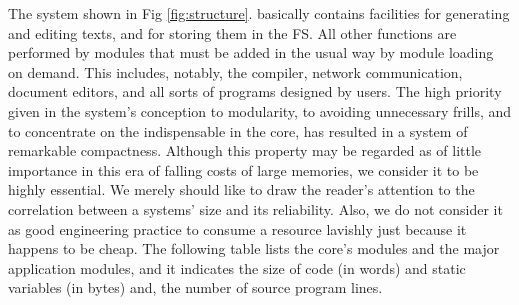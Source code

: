 The system shown in Fig \ref{fig:structure}. basically contains facilities for generating and editing texts, and for
storing them in the FS. All other functions are performed by modules that must be added in
the usual way by module loading on demand. This includes, notably, the compiler, network
communication, document editors, and all sorts of programs designed by users. The high priority
given in the system's conception to modularity, to avoiding unnecessary frills, and to concentrate on
the indispensable in the core, has resulted in a system of remarkable compactness. Although this
property may be regarded as of little importance in this era of falling costs of large memories, we
consider it to be highly essential. We merely should like to draw the reader's attention to the
correlation between a systems' size and its reliability. Also, we do not consider it as good
engineering practice to consume a resource lavishly just because it happens to be cheap. The
following table lists the core's modules and the major application modules, and it indicates the size
of code (in words) and static variables (in bytes) and, the number of source program lines.
